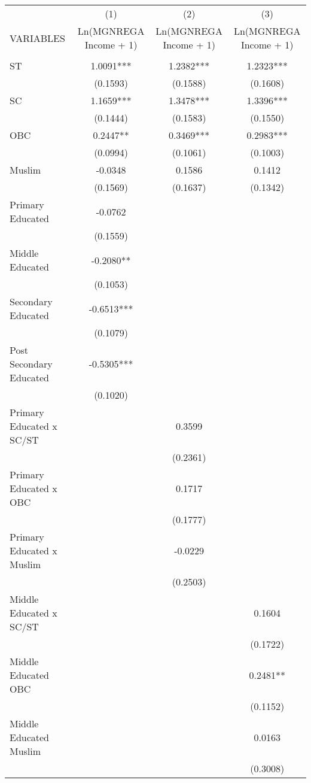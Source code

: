 \documentclass{article}
\begin{document}
\begin{landscape}

\begin{table}[]
\small
    \centering
    
\begin{tabular}{lccc} \hline
 & (1) & (2) & (3) \\
VARIABLES & Ln(MGNREGA Income + 1) & Ln(MGNREGA Income + 1) & Ln(MGNREGA Income + 1) \\ \hline \hline
 &  &  &  \\
ST & 1.0091*** & 1.2382*** & 1.2323*** \\
 & (0.1593) & (0.1588) & (0.1608) \\
SC & 1.1659*** & 1.3478*** & 1.3396*** \\
 & (0.1444) & (0.1583) & (0.1550) \\
OBC & 0.2447** & 0.3469*** & 0.2983*** \\
 & (0.0994) & (0.1061) & (0.1003) \\
Muslim & -0.0348 & 0.1586 & 0.1412 \\
 & (0.1569) & (0.1637) & (0.1342) \\
Primary Educated & -0.0762 &  &  \\
 & (0.1559) &  &  \\
Middle Educated & -0.2080** &  &  \\
 & (0.1053) &  &  \\
Secondary Educated & -0.6513*** &  &  \\
 & (0.1079) &  &  \\
Post Secondary Educated & -0.5305*** &  &  \\
 & (0.1020) &  &  \\
Primary Educated x SC/ST &  & 0.3599 &  \\
 &  & (0.2361) &  \\
Primary Educated x OBC &  & 0.1717 &  \\
 &  & (0.1777) &  \\
Primary Educated x Muslim &  & -0.0229 &  \\
 &  & (0.2503) &  \\
Middle Educated x SC/ST &  &  & 0.1604 \\
 &  &  & (0.1722) \\
Middle Educated OBC &  &  & 0.2481** \\
 &  &  & (0.1152) \\
Middle Educated Muslim &  &  & 0.0163 \\
 &  &  & (0.3008) \\

\end{tabular}
\end{table}
\end{landscape}
\end{document}
